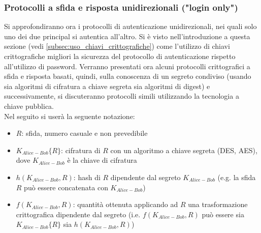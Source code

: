 \subsubsection{Protocolli a sfida e risposta unidirezionali ("login only")}
Si approfondiranno ora i protocolli di autenticazione unidirezionali, nei quali solo uno dei due principal si autentica all'altro.
Si è visto nell'introduzione a questa sezione (vedi \ref{subsec:uso_chiavi_crittografiche}) come l'utilizzo di chiavi crittografiche migliori la sicurezza del protocollo di autenticazione rispetto all'utilizzo di password. Verranno presentati ora alcuni protocolli crittografici a sfida e risposta basati, quindi, sulla conoscenza di un segreto condiviso (usando sia algoritmi di cifratura a chiave segreta sia algoritmi di digest) e successivamente, si discuteranno protocolli simili
utilizzando la tecnologia a chiave pubblica. \\
Nel seguito si userà la seguente notazione:
\begin{itemize}
	\item $R$: sfida, numero casuale e non prevedibile
	\item $K_{Alice-Bob}\lbrace R\rbrace$: cifratura di $R$ con un algoritmo a chiave segreta (DES, AES), dove $K_{Alice-Bob}$ è la chiave di cifratura
	\item $h(K_{Alice-Bob}, R)$: hash di $R$ dipendente dal segreto $K_{Alice-Bob}$ (e.g. la sfida $R$ può essere concatenata con $K_{Alice-Bob}$)
	\item $f(K_{Alice-Bob}, R)$: quantità ottenuta applicando ad $R$ una trasformazione crittografica dipendente dal segreto (i.e. $f(K_{Alice-Bob}, R)$ può essere sia $K_{Alice-Bob}\lbrace R\rbrace$ sia $h(K_{Alice-Bob}, R)$)
\end{itemize}
